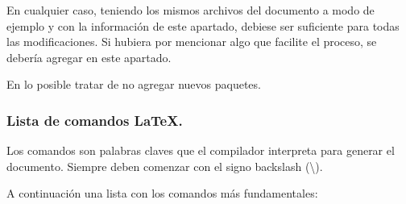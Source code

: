 En cualquier caso, teniendo los mismos archivos  del documento a modo de ejemplo y con la información de este apartado, debiese ser suficiente para todas las modificaciones. Si hubiera por mencionar algo que facilite el proceso, se debería agregar en este apartado.

En lo posible tratar de no agregar nuevos paquetes.

\subsubsection{Lista de comandos LaTeX.}\label{flujo:listado-comandos-latex}
Los comandos son palabras claves que el compilador interpreta para generar el documento. Siempre deben comenzar con el signo backslash (\textbackslash).

\noindent A continuación una lista con los comandos más fundamentales:

